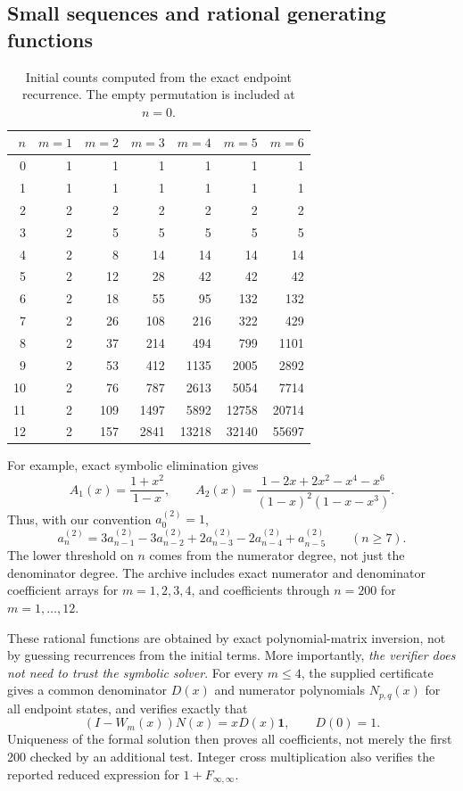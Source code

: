 \documentclass[11pt,a4paper]{article}
\theoremstyle{definition}\newaliascnt{definition}{theorem}
\theoremstyle{remark}\newaliascnt{remark}{theorem}
\newcommand{\one}{\mathbf 1}
\begin{document}
\subsection{Small sequences and rational generating functions}
\begin{table}[htbp]
\centering\small
\caption{Initial counts computed from the exact endpoint recurrence.
The empty permutation is included at $n=0$.}
\label{tab:counts}
\begin{tabular}{r|rrrrrr}
\toprule
$n$&$m=1$&$m=2$&$m=3$&$m=4$&$m=5$&$m=6$\\
\midrule
0&1&1&1&1&1&1\\
1&1&1&1&1&1&1\\
2&2&2&2&2&2&2\\
3&2&5&5&5&5&5\\
4&2&8&14&14&14&14\\
5&2&12&28&42&42&42\\
6&2&18&55&95&132&132\\
7&2&26&108&216&322&429\\
8&2&37&214&494&799&1101\\
9&2&53&412&1135&2005&2892\\
10&2&76&787&2613&5054&7714\\
11&2&109&1497&5892&12758&20714\\
12&2&157&2841&13218&32140&55697\\
\bottomrule
\end{tabular}
\end{table}

For example, exact symbolic elimination gives
\begin{equation}
 A_1(x)=\frac{1+x^2}{1-x},\qquad
 A_2(x)=\frac{1-2x+2x^2-x^4-x^6}{(1-x)^2(1-x-x^3)}.
 \label{eq:A12}
\end{equation}
Thus, with our convention $a_0^{(2)}=1$,
\[
 a_n^{(2)}=3a_{n-1}^{(2)}-3a_{n-2}^{(2)}+2a_{n-3}^{(2)}
          -2a_{n-4}^{(2)}+a_{n-5}^{(2)}\qquad(n\ge7).
\]
The lower threshold on $n$ comes from the numerator degree, not just the
denominator degree. The archive includes exact numerator and denominator
coefficient arrays for $m=1,2,3,4$, and coefficients through $n=200$ for
$m=1,\ldots,12$.

These rational functions are obtained by exact polynomial-matrix inversion,
not by guessing recurrences from the initial terms. More importantly,
\emph{the verifier does not need to trust the symbolic solver}. For every
$m\le4$, the supplied certificate gives a common denominator $D(x)$ and
numerator polynomials $N_{p,q}(x)$ for all endpoint states, and verifies
exactly that
\begin{equation}
 (I-W_m(x))N(x)=xD(x)\one,\qquad D(0)=1.
 \label{eq:symbolic-certificate}
\end{equation}
Uniqueness of the formal solution then proves all coefficients, not merely
the first 200 checked by an additional test. Integer cross multiplication
also verifies the reported reduced expression for $1+F_{\infty,\infty}$.
\end{document}
